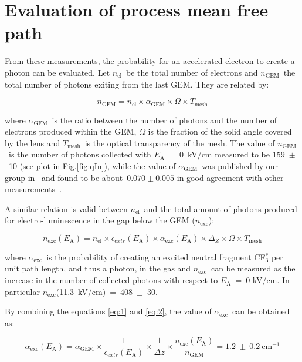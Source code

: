 \documentclass[a4paper,11pt]{article}
\newcommand{\Ea}  {$E_{\mathrm{A}}$}
\newcommand{\nel}  {$n_{\mathrm{el}}$}
\newcommand{\ngem}  {$n_{\mathrm{GEM}}$}
\newcommand{\agem}  {$\alpha_{\mathrm{GEM}}$}
\newcommand{\Tm}  {$T_{\mathrm{mesh}}$}
\newcommand{\nm}  {$n_{\mathrm{exc}}$}
\newcommand{\aex}  {$\alpha_{\mathrm{exc}}$}
\begin{document}
\section{Evaluation of process mean free path}

From these measurements, the probability for an accelerated electron to create a photon can be evaluated. Let \nel\ be the total number of electrons and \ngem\ the total number of photons exiting from the last GEM. They are related by:

\begin{equation}
n_{\mathrm{GEM}} = n_{\mathrm{el}} \times \alpha_{\mathrm{GEM}} \times \Omega \times T_{\mathrm{mesh}}
\label{eq:1}
\end{equation}

where \agem\ is the ratio between the number of photons and the number of electrons produced within the GEM, $\Omega$ is the fraction of the solid angle covered by the lens and \Tm\ is the optical transparency of the mesh.
The value of \ngem\ is the number of photons collected with \Ea~=~0~kV/cm measured to be 159~$\pm$~10 (see plot in Fig.\ref{fig:qIn}), while the value of \agem\ was published by our group in~\cite{bib:ieee_orange} and found to be about~$0.070\pm0.005$ in good agreement with other measurements~\cite{bib:Margato1}.

A similar relation is valid between \nel\ and the total amount of photons produced for electro-luminescence in the gap below the GEM (\nm):

\begin{equation}
n_{\mathrm{exc}}(E_{\mathrm{A}}) =  n_{\mathrm{el}} \times \epsilon_{extr}(E_{\mathrm{A}}) \times \alpha_{\mathrm{exc}}(E_{\mathrm{A}}) \times \Delta_Z \times \Omega \times T_{\mathrm{mesh}} 
\label{eq:2}
\end{equation}

where \aex\ is the probability of creating an excited neutral fragment CF$^*_3$ per unit path length, and thus a photon, in the gas and \nm\ can be measured as the increase in the number of collected photons with respect to \Ea~=~0 kV/cm. 
In particular $n_{\mathrm{exc}}$(11.3~kV/cm)~=~408~$\pm$~30.

By combining the equations \ref{eq:1} and \ref{eq:2}, the value of \aex\ can be obtained as:

\begin{equation}
\alpha_{\mathrm{exc}}(E_{\mathrm{A}}) = \alpha_{\mathrm{GEM}} \times \frac{1}{\epsilon_{extr}(E_{\mathrm{A}})} \times \frac{1}{\Delta z} \times \frac{n_{\mathrm{exc}}(E_{\mathrm{A}})}{n_{\mathrm{GEM}}} = 1.2~\pm~0.2~{\mathrm{cm}} ^{-1}
\end{equation}
\end{document}
